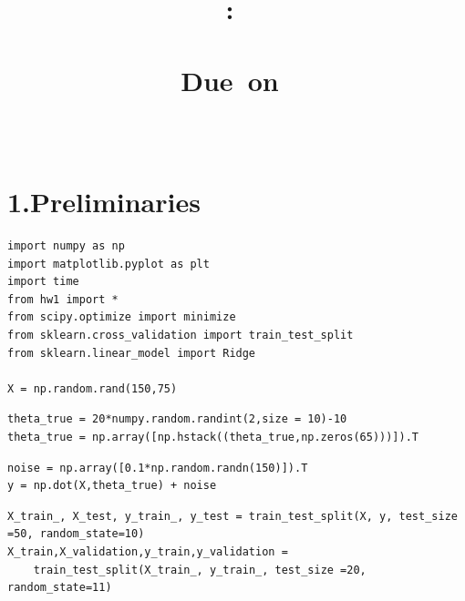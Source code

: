 \documentclass{article}
\title{
    \vspace{2in}
    \textmd{\textbf{\hmwkClass:\ \hmwkTitle \\ \hmwksubtitle }}\\
    \vspace{1in}
    \normalsize\vspace{0.1in}\small{Due\ on\ \hmwkDueDate}\\
    \vspace{0.1in}\large{\textit{\hmwkClassInstructor}}
    \vspace{3in}
}
\author{\textbf{\hmwkAuthorName} \\ \textbf{\hmwknetid }}
\date{}
\newenvironment{problem}[2][$\bullet$]{\begin{trivlist}\large
		\item[\hskip \labelsep {\bfseries #1}\hskip \labelsep {\bfseries #2.}]}  {\end{trivlist}}
\newenvironment{sub}[2][$-$]{\begin{trivlist}
		\item[\hskip \labelsep {\bfseries #1}\hskip \labelsep {\bfseries #2.}]}  {\end{trivlist}}
\begin{document}
\maketitle

\pagebreak


%

\section{1.Preliminaries }
\begin{problem}{\large{1.1 Feature Normalization}}
\end{problem}

\begin{sub}{1.1.1}
\end{sub}
\begin{verbatim}
import numpy as np
import matplotlib.pyplot as plt
import time
from hw1 import *
from scipy.optimize import minimize
from sklearn.cross_validation import train_test_split
from sklearn.linear_model import Ridge

X = np.random.rand(150,75)
\end{verbatim}

\begin{sub}{1.1.2}
\end{sub}
\begin{verbatim}
theta_true = 20*numpy.random.randint(2,size = 10)-10
theta_true = np.array([np.hstack((theta_true,np.zeros(65)))]).T
\end{verbatim}

\begin{sub}{1.1.3}
\end{sub}
\begin{verbatim}
noise = np.array([0.1*np.random.randn(150)]).T
y = np.dot(X,theta_true) + noise
\end{verbatim}

\begin{sub}{1.1.4}
\end{sub}
\begin{verbatim}
X_train_, X_test, y_train_, y_test = train_test_split(X, y, test_size =50, random_state=10)
X_train,X_validation,y_train,y_validation = 
	train_test_split(X_train_, y_train_, test_size =20, random_state=11)
\end{verbatim}

\vspace{0.2in}

\begin{problem}{\large{1.2 Experiment with Ridge Regression}}
\end{problem}
\end{document}
